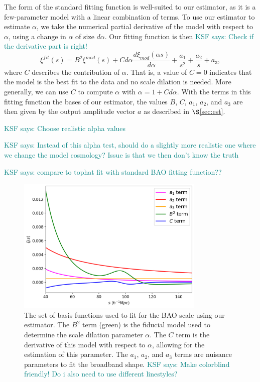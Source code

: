 \documentclass[modern]{aastex62}
\newcommand{\KSF}[1]{\textcolor{teal}{KSF says: #1}}
\begin{document}
The form of the standard fitting function is well-suited to our estimator, as it is a few-parameter model with a linear combination of terms.
To use our estimator to estimate $\alpha$, we take the numerical partial derivative of the model with respect to $\alpha$, using a change in $\alpha$ of size $d\alpha$.
Our fitting function is then
\KSF{Check if the derivative part is right!}
\begin{equation}
\xi^{fit}(s) = B^2 \xi^{mod}(s) + C d\alpha\frac{d\xi_{mod}(\alpha s)}{d\alpha} + \frac{a_1}{s^2} + \frac{a_2}{s} + a_3,
\end{equation}
where $C$ describes the contribution of $\alpha$.
That is, a value of $C=0$ indicates that the model is the best fit to the data and no scale dilation is needed.
More generally, we can use $C$ to compute $\alpha$ with $\alpha = 1 + Cd\alpha$.
With the terms in this fitting function the bases of our estimator, the values $B$, $C$, $a_1$, $a_2$, and $a_3$ are then given by the output amplitude vector $a$ as described in $\S$\ref{sec:est}.

\KSF{Choose realistic alpha values}

\KSF{Instead of this alpha test, should do a slightly more realistic one where we change the model cosmology? Issue is that we then don't know the truth}

\KSF{compare to tophat fit with standard BAO fitting function??}

\label{fig:bao_bases}
\begin{figure}[ht]
\centering
    \includegraphics[width=0.8\textwidth]{bao_bases}
    \caption{The set of basis functions used to fit for the BAO scale using our estimator. The $B^2$ term (green) is the fiducial model used to determine the scale dilation parameter $\alpha$. The $C$ term is the derivative of this model with respect to $\alpha$, allowing for the estimation of this parameter. The $a_1$, $a_2$, and $a_3$ terms are nuisance parameters to fit the broadband shape. \KSF{Make colorblind friendly! Do i also need to use different linestyles?}}
\end{figure}
\end{document}
